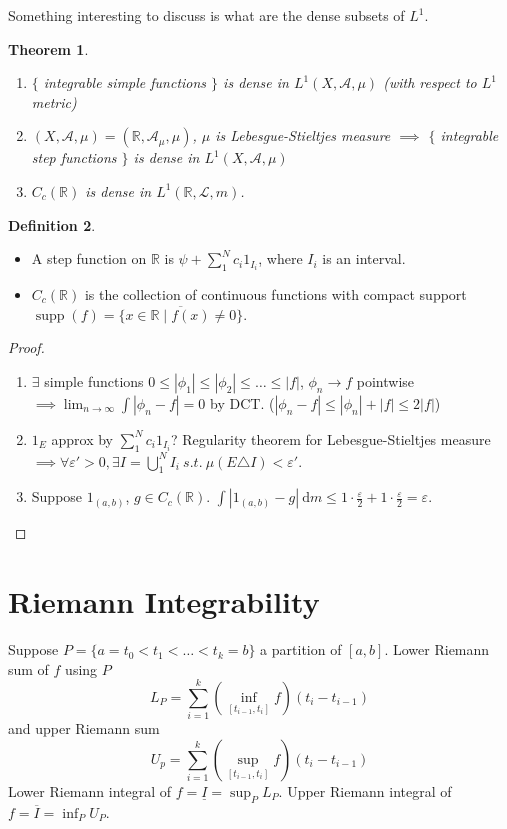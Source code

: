 \documentclass{report}
\newcommand{\R}{\mathbb{R}}
\newcommand{\st}{\ s.t.\ }
\newcommand{\cA}{\mathcal{A}}
\def \supp {\operatorname{supp}}
\newcommand{\df}{\ \mathrm{d}}
\newtheorem{theorem}{Theorem}[chapter]
\theoremstyle{definition}
\newtheorem{definition}[theorem]{Definition}
\theoremstyle{remark}
\newcommand{\fnl}{\parbox[t]{0\linewidth}{}}
\begin{document}
Something interesting to discuss is what are the dense subsets of $L^1$.
\begin{theorem}\fnl
	\begin{enumerate}
		\item $\{$ integrable simple functions $\}$ is dense in $L^1(X, \cA, \mu)$ (with respect to $L^1$ metric)
		\item $(X, \cA, \mu) = (\R, \cA_\mu, \mu)$, $\mu$ is Lebesgue-Stieltjes measure $\implies$ $\{$ integrable step functions $\}$ is dense in $L^1(X, \cA, \mu)$ 
		\item $C_c(\R)$ is dense in $L^1(\R, \mathcal{L}, m)$.
	\end{enumerate}
\end{theorem}
\begin{definition}\fnl
	\begin{itemize}
		\item A step function on $\R$ is $\psi + \sum_1^N c_i 1_{I_i}$, where $I_i$ is an interval.
		\item $C_c(\R)$ is the collection of continuous functions with compact support $\supp(f) = \overline{\{x \in \R \mid f(x) \neq 0\}}$.
	\end{itemize}
\end{definition}
\begin{proof}
	\begin{enumerate}
		\item $\exists$ simple functions $0 \leq |\phi_1| \leq |\phi_2| \leq \ldots \leq |f|$, $\phi_n \to f$ pointwise $\implies \displaystyle \lim_{n \to \infty} \int |\phi_n - f| = 0$ by DCT. ($|\phi_n - f| \leq |\phi_n| + |f| \leq 2|f|$)
		\item $1_E$ approx by $\sum_1^N c_i1_{I_i}$? Regularity theorem for Lebesgue-Stieltjes measure $\implies \forall \varepsilon' > 0, \exists I = \bigcup_1^N I_i \st \mu(E \triangle I) < \varepsilon'$.
		\item Suppose $1_{(a, b)}$, $g \in C_c(\R)$. $\displaystyle \int |1_{(a, b)} - g|\df m \leq 1 \cdot \frac{\varepsilon}{2} + 1 \cdot \frac{\varepsilon}{2} = \varepsilon$. \qedhere
	\end{enumerate}
\end{proof}

\section{Riemann Integrability} 
Suppose $P = \{a = t_0 < t_1 < \ldots < t_k = b\}$ a partition of $[a, b]$. Lower Riemann sum of $f$ using $P$
\[L_P = \sum_{i = 1}^k \left(\inf_{[t_{i-1}, t_i]} f\right)(t_i - t_{i - 1})\] and upper Riemann sum
\[U_p = \sum_{i = 1}^k \left(\sup_{[t_{i-1}, t_i]} f\right)(t_i - t_{i - 1})\]
Lower Riemann integral of $f = \underline{I} = \sup_P L_P$. Upper Riemann integral of $f = \overline{I} = \inf_P U_P$.
\end{document}
